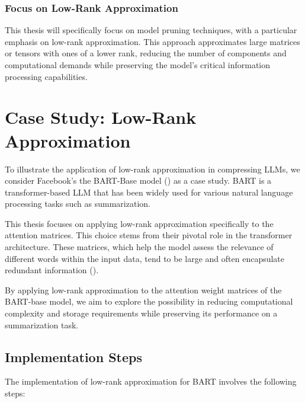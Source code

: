         \subsubsection{Focus on Low-Rank Approximation}
        This thesis will specifically focus on model pruning techniques, with a particular emphasis on low-rank approximation. This approach approximates large matrices or tensors with ones of a lower rank, reducing the number of components and computational demands while preserving the model's critical information processing capabilities.


\section{Case Study: Low-Rank Approximation}
    To illustrate the application of low-rank approximation in compressing LLMs, we consider Facebook's the BART-Base model (\cite{lewis2019bart}) as a case study. BART is a transformer-based LLM that has been widely used for various natural language processing tasks such as summarization.

    This thesis focuses on applying low-rank approximation specifically to the attention matrices. This choice stems from their pivotal role in the transformer architecture. These matrices, which help the model assess the relevance of different words within the input data, tend to be large and often encapsulate redundant information (\cite{aghajanyan2020intrinsic}). %

    By applying low-rank approximation to the attention weight matrices of the BART-base model, we aim to explore the possibility in reducing computational complexity and storage requirements while preserving its performance on a summarization task.
    \subsection{Implementation Steps}
        The implementation of low-rank approximation for BART involves the following steps:
        
